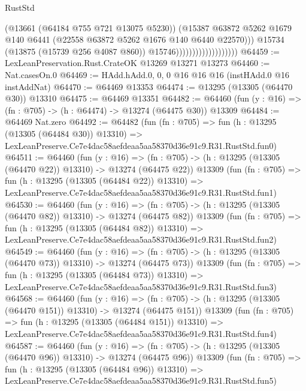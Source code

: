 \begin{lexlean}{RustStd}
\begin{coremodule}
                                            (@13661 (@64184 @755 @721 @13075 @5230))
                                            (@15387
                                              @63872
                                              @5262
                                              @1679
                                              @140
                                              @6441
                                              (@22558 @63872 @5262 @1676 @140 @6440 @22570)))
                                          @15734
                                          (@13875 (@15739 @256 @4087 @860))
                                          @15746)))))))))))))))))))
@64459 := LexLeanPreservation.Rust.CrateOK @13269 @13271 @13273
@64460 := Nat.casesOn.{0}
@64469 := HAdd.hAdd.{0, 0, 0} @16 @16 @16 (instHAdd.{0} @16 instAddNat)
@64470 := @64469 @13353
@64474 := @13295 (@13305 (@64470 @30)) @13310
@64475 := @64469 @13351
@64482 := @64460 (fun (y : @16) => (fn : @705) -> (h : @64474) -> @13274 (@64475 @30)) @13309
@64484 := @64469 Nat.zero
@64492 := @64482
    (fun (fn : @705) =>
    fun (h : @13295 (@13305 (@64484 @30)) @13310) =>
    LexLeanPreserve.Ce7e4dac58aefdeaa5aa58370d36e91c9.R31.RustStd.fun0)
@64511 := @64460
    (fun (y : @16) =>
    (fn : @705) -> (h : @13295 (@13305 (@64470 @22)) @13310) -> @13274 (@64475 @22))
    @13309
    (fun (fn : @705) =>
    fun (h : @13295 (@13305 (@64484 @22)) @13310) =>
    LexLeanPreserve.Ce7e4dac58aefdeaa5aa58370d36e91c9.R31.RustStd.fun1)
@64530 := @64460
    (fun (y : @16) =>
    (fn : @705) -> (h : @13295 (@13305 (@64470 @82)) @13310) -> @13274 (@64475 @82))
    @13309
    (fun (fn : @705) =>
    fun (h : @13295 (@13305 (@64484 @82)) @13310) =>
    LexLeanPreserve.Ce7e4dac58aefdeaa5aa58370d36e91c9.R31.RustStd.fun2)
@64549 := @64460
    (fun (y : @16) =>
    (fn : @705) -> (h : @13295 (@13305 (@64470 @73)) @13310) -> @13274 (@64475 @73))
    @13309
    (fun (fn : @705) =>
    fun (h : @13295 (@13305 (@64484 @73)) @13310) =>
    LexLeanPreserve.Ce7e4dac58aefdeaa5aa58370d36e91c9.R31.RustStd.fun3)
@64568 := @64460
    (fun (y : @16) =>
    (fn : @705) -> (h : @13295 (@13305 (@64470 @151)) @13310) -> @13274 (@64475 @151))
    @13309
    (fun (fn : @705) =>
    fun (h : @13295 (@13305 (@64484 @151)) @13310) =>
    LexLeanPreserve.Ce7e4dac58aefdeaa5aa58370d36e91c9.R31.RustStd.fun4)
@64587 := @64460
    (fun (y : @16) =>
    (fn : @705) -> (h : @13295 (@13305 (@64470 @96)) @13310) -> @13274 (@64475 @96))
    @13309
    (fun (fn : @705) =>
    fun (h : @13295 (@13305 (@64484 @96)) @13310) =>
    LexLeanPreserve.Ce7e4dac58aefdeaa5aa58370d36e91c9.R31.RustStd.fun5)

\end{coremodule}
\end{lexlean}
